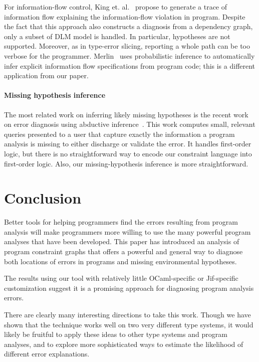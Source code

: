 For information-flow control, King et. al.~\cite{king:fse} propose to
generate a trace of information flow explaining the information-flow
violation in program. Despite the fact that this approach also
constructs a diagnosis from a dependency graph, only a subset of DLM
model is handled. In particular, hypotheses are not supported.
Moreover, as in type-error slicing, reporting a whole path can be
too verbose for the programmer.  Merlin~\cite{livshits:merlin} uses
probabilistic inference to automatically infer explicit information
flow specifications from program code; this is a different
application from our paper.

\paragraph{Missing hypothesis inference}

The most related work on inferring likely missing hypotheses is the
recent work on error diagnosis using abductive
inference~\cite{dillig:pldi12}. This work computes small, relevant
queries presented to a user that capture exactly the information a
program analysis is missing to either discharge or validate the error.
It handles first-order logic, but there is no straightforward
way to encode our constraint language into first-order logic.
Also, our missing-hypothesis inference is more straightforward.


\section{Conclusion}

Better tools for helping programmers find the errors resulting from
program analysis will make programmers more willing to use the many
powerful program analyses that have been developed. This paper has
introduced an analysis of program constraint graphs that offers a
powerful and general way to diagnose both locations of errors in
programs and missing environmental hypotheses.

The results using our tool with relatively little OCaml-specific or
Jif-specific customization suggest it is a promising approach for
diagnosing program analysis errors.

There are clearly many interesting directions to take this work.
Though we have shown that the technique works well on two very
different type systems, it would likely be fruitful to apply these
ideas to other type systems and program analyses, and to explore more
sophisticated ways to estimate the likelihood of different error
explanations.





